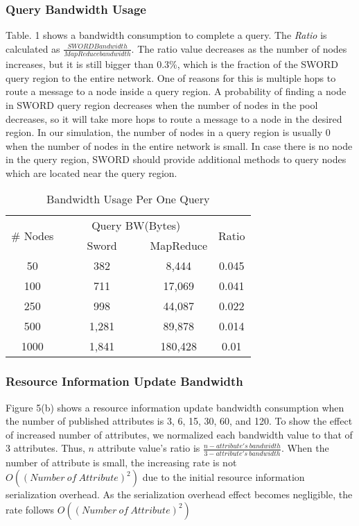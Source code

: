 \documentclass{acm_proc_article-sp}
\begin{document}
\subsubsection{Query Bandwidth Usage}
Table. 1 shows a bandwidth consumption to complete a query. The \textit{Ratio} is calculated as \begin{math}\frac{SWORD Bandwidth}{MapReduce bandwidth}\end{math}. The ratio value decreases as the number of nodes
increases, but it is still bigger than 0.3\%, which is the fraction of the SWORD query region to the entire network. One of reasons for this is multiple hops to route a message to a node inside a query region.
A probability of finding a node in SWORD query region decreases when the number of nodes in the pool decreases, so it will take more hops to route a message to a node in the desired region. 
In our simulation, the number of nodes in a query region is usually 0 when the number of nodes in the entire network is small. 
In case there is no node in the query region, SWORD should provide additional methods to query nodes which are located near the query region.
\begin{table}
\centering
\caption{Bandwidth Usage Per One Query}
\begin{center}
\begin{tabular}{|c|c|c|c|} \hline
\multirow{2}{*}{\# Nodes}&\multicolumn{2}{|c|}{Query BW(Bytes)}&\multirow{2}{*}{Ratio} \\ \cline{2-3}
\ &\ \ \ \ Sword\ \ \ \ &MapReduce& \\ \hline\hline
50&382&8,444&0.045\\ \hline
100&711&17,069&0.041\\ \hline
250&998&44,087&0.022\\ \hline
500&1,281&89,878&0.014\\ \hline
1000&1,841&180,428&0.01\\ \hline
\end{tabular}
\end{center}
\end{table}
\subsubsection{Resource Information Update Bandwidth}
Figure 5(b) shows a resource information update bandwidth consumption when the number of published attributes is 3, 6, 15, 30, 60, and 120. 
To show the effect of increased number of attributes, we normalized each bandwidth value to that of 3 attributes.
Thus, $n$ attribute value's ratio is \begin{math}\frac{n-attribute's\ bandwidth}{3-attribute's\ bandwidth}\end{math}. 
When the number of attribute is small, the increasing rate is not $O((Number\ of\ Attribute)^2)$ due to the initial resource information serialization overhead.
As the serialization overhead effect becomes negligible, the rate follows $O((Number\ of\ Attribute)^2)$
\end{document}
